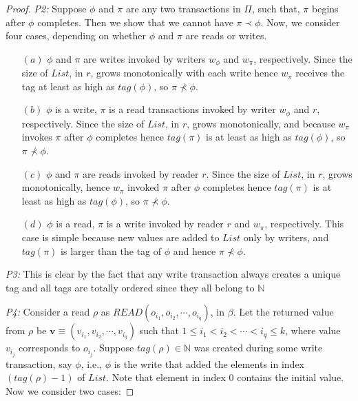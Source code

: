 {\begin{proof}
	\emph{P2:}  Suppose $\phi$ and $ \pi$ are any two transactions in $\Pi$, such that, $\pi$ begins after $\phi$ completes. 
	Then we show that we cannot have $\pi \prec \phi$. Now, we consider four cases, depending on whether $\phi$ and $\pi$ are {\sc read}s or {\sc write}s.	
	\begin{enumerate}
	    \item [$(a)$] $\phi$ and $\pi$ are {\sc write}s invoked by writers $w_{\phi}$ and $w_{\pi}$, respectively. Since the size of $List$, in $r$,  grows monotonically with each {\sc write}  hence  $w_{\pi}$ receives the  tag at least as high as $tag(\phi)$, so $\pi\not \prec \phi$.
	       \item [$(b)$] $\phi$ is a {\sc write}, $\pi$ is a {\sc read} transactions invoked by writer $w_{\phi}$ and $r$, respectively.  
	        Since the size of $List$, in $r$,  grows monotonically, and because  $w_{\pi}$ invokes $\pi$ after $\phi$ completes hence  $tag(\pi)$ is at least as high as $tag(\phi)$, so $\pi\not \prec \phi$.
	        \item[$(c)$] $\phi$ and $\pi$ are {\sc read}s  invoked by reader $r$. 
	           Since the size of $List$, in $r$,  grows monotonically,  hence  $w_{\pi}$ invoked $\pi$ after $\phi$ completes hence $tag(\pi)$ is at least as high as $tag(\phi)$, so $\pi\not \prec \phi$.
	         \item [$(d)$] $\phi$ is a {\sc read}, $\pi$ is a {\sc write}  invoked by reader $r$ and $w_{\pi}$, respectively.
	         This case is simple because new values are added to $List$  only  by writers, and $tag(\pi)$ 
	         is larger than the tag of $\phi$ and hence   $\pi\not \prec \phi$. 
	\end{enumerate}
	
	\emph{P3:} This is clear by the fact that any {\sc write} transaction always creates a unique tag and all tags are totally ordered since they all belong to $\mathbb{N}$
	
	\emph{P4:} Consider a {\sc read} $\rho$ as $READ(o_{i_1}, o_{i_2}, \cdots, o_{i_q})$, in $\beta$. 
Let the returned value from $\rho$ be $\mathbf{v} \equiv $$(v_{i_1}, v_{i_2}, \cdots, v_{i_q})$ such that 
$1 \leq {i_1} <  {i_2} <  \cdots <  {i_q} \leq k$, where value  $v_{i_j}$ corresponds to $o_{i_j}$. 
	Suppose $tag(\rho) \in \mathbb{N}$ was created during some {\sc write} transaction, say $\phi$, i.e., $\phi$ is the {\sc write} that 
	added the elements in index $(tag(\rho)-1)$ of $List$. Note that element in index $0$ contains the initial value.
	 Now we consider two cases:
	 

\end{proof}}
